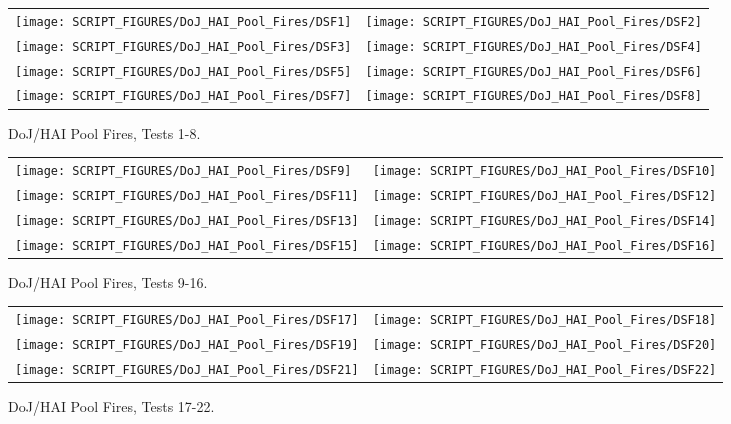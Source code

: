 \begin{figure}[p]
\begin{tabular*}{\textwidth}{l@{\extracolsep{\fill}}r}
\texttt{[image: SCRIPT\_FIGURES/DoJ\_HAI\_Pool\_Fires/DSF1]} &
\texttt{[image: SCRIPT\_FIGURES/DoJ\_HAI\_Pool\_Fires/DSF2]} \\
\texttt{[image: SCRIPT\_FIGURES/DoJ\_HAI\_Pool\_Fires/DSF3]} &
\texttt{[image: SCRIPT\_FIGURES/DoJ\_HAI\_Pool\_Fires/DSF4]} \\
\texttt{[image: SCRIPT\_FIGURES/DoJ\_HAI\_Pool\_Fires/DSF5]} &
\texttt{[image: SCRIPT\_FIGURES/DoJ\_HAI\_Pool\_Fires/DSF6]} \\
\texttt{[image: SCRIPT\_FIGURES/DoJ\_HAI\_Pool\_Fires/DSF7]} &
\texttt{[image: SCRIPT\_FIGURES/DoJ\_HAI\_Pool\_Fires/DSF8]}
\end{tabular*}
\caption[DoJ/HAI Pool Fires, Tests 1-8]{DoJ/HAI Pool Fires, Tests 1-8.}
\label{DoJ_HAI_Pool_Fires_1}
\end{figure}

\begin{figure}[p]
\begin{tabular*}{\textwidth}{l@{\extracolsep{\fill}}r}
\texttt{[image: SCRIPT\_FIGURES/DoJ\_HAI\_Pool\_Fires/DSF9]} &
\texttt{[image: SCRIPT\_FIGURES/DoJ\_HAI\_Pool\_Fires/DSF10]} \\
\texttt{[image: SCRIPT\_FIGURES/DoJ\_HAI\_Pool\_Fires/DSF11]} &
\texttt{[image: SCRIPT\_FIGURES/DoJ\_HAI\_Pool\_Fires/DSF12]} \\
\texttt{[image: SCRIPT\_FIGURES/DoJ\_HAI\_Pool\_Fires/DSF13]} &
\texttt{[image: SCRIPT\_FIGURES/DoJ\_HAI\_Pool\_Fires/DSF14]} \\
\texttt{[image: SCRIPT\_FIGURES/DoJ\_HAI\_Pool\_Fires/DSF15]} &
\texttt{[image: SCRIPT\_FIGURES/DoJ\_HAI\_Pool\_Fires/DSF16]}
\end{tabular*}
\caption[DoJ/HAI Pool Fires, Tests 9-16]{DoJ/HAI Pool Fires, Tests 9-16.}
\label{DoJ_HAI_Pool_Fires_2}
\end{figure}

\begin{figure}[p]
\begin{tabular*}{\textwidth}{l@{\extracolsep{\fill}}r}
\texttt{[image: SCRIPT\_FIGURES/DoJ\_HAI\_Pool\_Fires/DSF17]} &
\texttt{[image: SCRIPT\_FIGURES/DoJ\_HAI\_Pool\_Fires/DSF18]} \\
\texttt{[image: SCRIPT\_FIGURES/DoJ\_HAI\_Pool\_Fires/DSF19]} &
\texttt{[image: SCRIPT\_FIGURES/DoJ\_HAI\_Pool\_Fires/DSF20]} \\
\texttt{[image: SCRIPT\_FIGURES/DoJ\_HAI\_Pool\_Fires/DSF21]} &
\texttt{[image: SCRIPT\_FIGURES/DoJ\_HAI\_Pool\_Fires/DSF22]}
\end{tabular*}
\caption[DoJ/HAI Pool Fires, Tests 17-22]{DoJ/HAI Pool Fires, Tests 17-22.}
\label{DoJ_HAI_Pool_Fires_3}
\end{figure}

